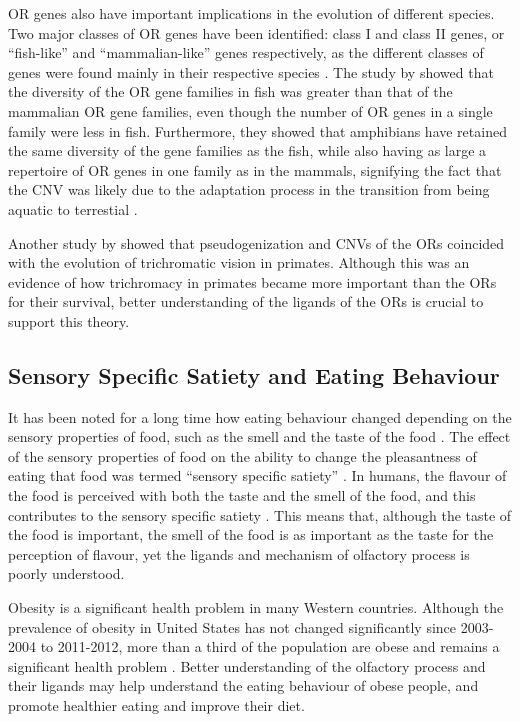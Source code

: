 \documentclass[a4paper, 12pt]{article}
\begin{document}
OR genes also have important implications in the evolution of different species.
Two major classes of OR genes have been identified: class I and class II genes, or ``fish-like'' and ``mammalian-like'' genes respectively, as the different classes of genes were found mainly in their respective species \citep{Glusman2000}.
The study by \citet{Niimura2005} showed that the diversity of the OR gene families in fish was greater than that of the mammalian OR gene families, even though the number of OR genes in a single family were less in fish.
Furthermore, they showed that amphibians have retained the same diversity of the gene families as the fish, while also having as large a repertoire of OR genes in one family as in the mammals, signifying the fact that the CNV was likely due to the adaptation process in the transition from being aquatic to terrestial \citep{Niimura2005}.

Another study by \citet{Liman2003} showed that pseudogenization and CNVs of the ORs coincided with the evolution of trichromatic vision in primates.
Although this was an evidence of how trichromacy in primates became more important than the ORs for their survival, better understanding of the ligands of the ORs is crucial to support this theory.

\subsection*{Sensory Specific Satiety and Eating Behaviour}

It has been noted for a long time how eating behaviour changed depending on the sensory properties of food, such as the smell and the taste of the food \citep{Rolls1981, Rolls1982}.
The effect of the sensory properties of food on the ability to change the pleasantness of eating that food was termed ``sensory specific satiety'' \citep{Rolls1981}.
In humans, the flavour of the food is perceived with both the taste and the smell of the food, and this contributes to the sensory specific satiety \citep{Rolls2005}.
This means that, although the taste of the food is important, the smell of the food is as important as the taste for the perception of flavour, yet the ligands and mechanism of olfactory process is poorly understood.

Obesity is a significant health problem in many Western countries.
Although the prevalence of obesity in United States has not changed significantly since 2003-2004 to 2011-2012, more than a third of the population are obese and remains a significant health problem \citep{Ogden2014}.
Better understanding of the olfactory process and their ligands may help understand the eating behaviour of obese people, and promote healthier eating and improve their diet.
\end{document}
